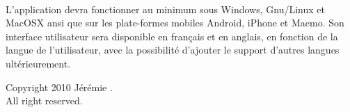 \documentclass[pdftex,a4paper,11pt]{article}
\begin{document}
\paragraph{}
L'application devra fonctionner au minimum sous Windows, Gnu/Linux et MacOSX ansi que sur les plate-formes mobiles Android, iPhone et Maemo.
Son interface utilisateur sera disponible en français et en anglais, en fonction de la langue de l'utilisateur, avec la possibilité d'ajouter le support d'autres langues ultérieurement.


\clearpage

\begin{center}
    Copyright \textcopyright{} 2010 Jérémie .\\
    All right reserved.
\end{center}
\end{document}
